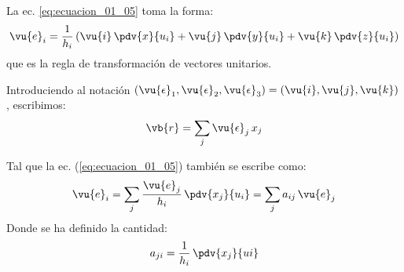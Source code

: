 La ec. \ref{eq:ecuacion_01_05} toma la forma:
\begin{align}
\vu{e}_{i} = \dfrac{1}{h_{i}} \left( \vu{i} \, \pdv{x}{u_{i}} + \vu{j} \, \pdv{y}{u_{i}} + \vu{k} \, \pdv{z}{u_{i}} \right)
\label{eq:ecuacion_01_12}
\end{align}
que es la regla de transformación de vectores unitarios.
\par
Introduciendo al notación $(\vu{\epsilon}_{1}, \vu{\epsilon}_{2}, \vu{\epsilon}_{3}) = (\vu{i}, \vu{j}, \vu{k})$, escribimos:
\begin{align*}
\vb{r} = \sum_{j} \vu{\epsilon}_{j} \, x_{j}
\end{align*}
\par
Tal que la ec. (\ref{eq:ecuacion_01_05}) también se escribe como:
\begin{align}
\vu{e}_{i} = \sum_{j} \dfrac{\vu{e}_{j}}{h_{i}} \, \pdv{x_{j}}{u_{i}} = \sum_{j} a_{ij} \, \vu{e}_{j}
\label{eq:ecuacion_01_13}
\end{align}
Donde se ha definido la cantidad:
\begin{align}
a_{ji} = \dfrac{1}{h_{i}} \, \pdv{x_{j}}{u{i}}
\label{eq:ecuacion_01_14}
\end{align}

